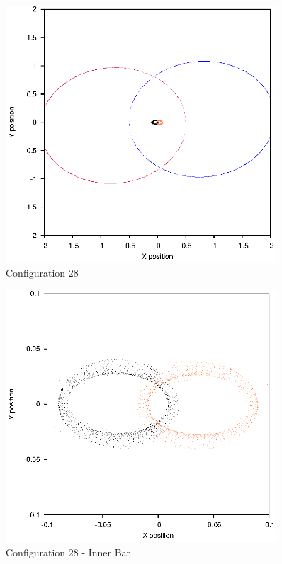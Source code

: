 \documentclass[a4paper,12pt]{article}
\begin{document}
\begin{figure}[H]
\centering
\includegraphics[width=0.9\textwidth]{./2017results/12-11-115-015/Orbit.eps}
\caption{Configuration 28}
\label{fig:config28}
\end{figure}
\begin{figure}[H]
\centering
\includegraphics[width=0.9\textwidth]{./2017results/12-11-115-015/Inner.eps}
\caption{Configuration 28 - Inner Bar}
\label{fig:config28i}
\end{figure}
\end{document}
